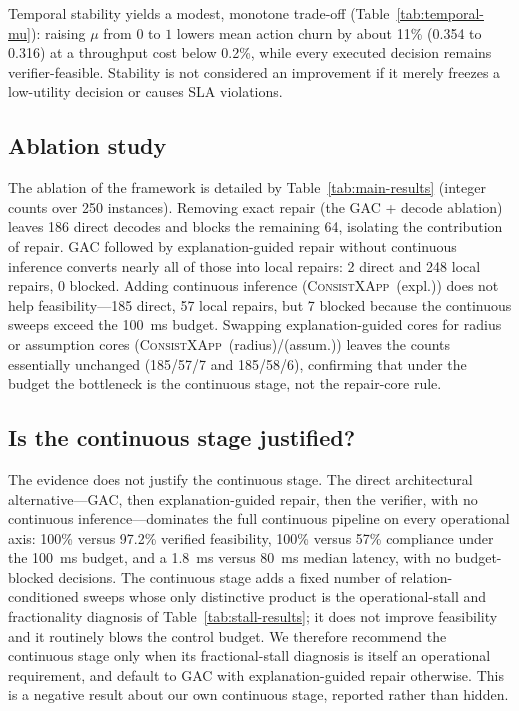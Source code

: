 \documentclass[pdflatex,sn-mathphys-num,iicol,oneside]{sn-jnl}
\newcommand{\method}{\textsc{ConsistXApp}}
\begin{document}
Temporal stability yields a modest, monotone trade-off
(Table~\ref{tab:temporal-mu}): raising $\mu$ from $0$ to $1$ lowers mean
action churn by about 11\% (0.354 to 0.316) at a throughput cost below
0.2\%, while every executed decision remains verifier-feasible.
Stability is not considered an improvement if it merely freezes a
low-utility decision or causes SLA violations.

\subsection{Ablation study}

The ablation of the framework is detailed by
Table~\ref{tab:main-results} (integer counts over 250 instances).
Removing exact repair (the GAC + decode ablation) leaves 186 direct
decodes and blocks the remaining 64, isolating the contribution of
repair. GAC followed by explanation-guided repair without continuous
inference converts nearly all of those into local repairs: 2 direct and
248 local repairs, 0 blocked. Adding continuous inference
(\method\ (expl.)) does not help feasibility---185 direct, 57 local
repairs, but 7 blocked because the continuous sweeps exceed the 100~ms
budget. Swapping explanation-guided cores for radius or assumption cores
(\method\ (radius)/(assum.)) leaves the counts essentially unchanged
(185/57/7 and 185/58/6), confirming that under the budget the
bottleneck is the continuous stage, not the repair-core rule.

\subsection{Is the continuous stage justified?}

The evidence does not justify the continuous stage. The direct
architectural alternative---GAC, then explanation-guided repair, then
the verifier, with no continuous inference---dominates the full
continuous pipeline on every operational axis: 100\% versus 97.2\%
verified feasibility, 100\% versus 57\% compliance under the 100~ms
budget, and a 1.8~ms versus 80~ms median latency, with no budget-blocked
decisions. The continuous stage adds a fixed number of
relation-conditioned sweeps whose only distinctive product is the
operational-stall and fractionality diagnosis of
Table~\ref{tab:stall-results}; it does not improve feasibility and it
routinely blows the control budget. We therefore recommend the
continuous stage only when its fractional-stall diagnosis is itself an
operational requirement, and default to GAC with explanation-guided
repair otherwise. This is a negative result about our own continuous
stage, reported rather than hidden.
\end{document}
